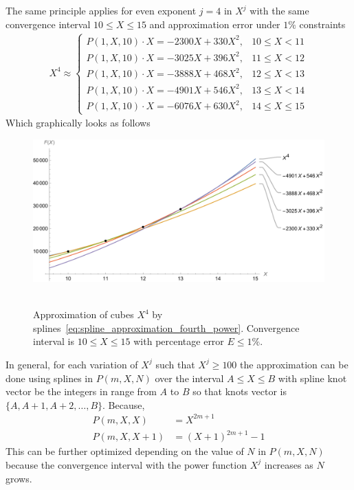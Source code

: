 The same principle applies for even exponent $j=4$ in $X^j$ with the same convergence interval $10 \leq X \leq 15$
and approximation error under $1\%$ constraints
\begin{align}
    X^4 \approx
    \begin{cases}
        P(1,X,10) \cdot X = -2300X + 330X^2, & 10 \leq X < 11 \\
        P(1,X,10) \cdot X = -3025X + 396X^2, & 11 \leq X < 12 \\
        P(1,X,10) \cdot X = -3888X + 468X^2, & 12 \leq X < 13 \\
        P(1,X,10) \cdot X = -4901X + 546X^2, & 13 \leq X < 14 \\
        P(1,X,10) \cdot X = -6076X + 630X^2, & 14 \leq X \leq 15
    \end{cases}
    \label{eq:spline_approximation_fourth_power}
\end{align}
Which graphically looks as follows
\begin{figure}[H]
    \centering
    \includegraphics[width=1\textwidth]{sections/images/09_plots_of_fourth_power_with_p_2_10_15_times_x}
    ~\caption{
        Approximation of cubes $X^4$ by splines~\eqref{eq:spline_approximation_fourth_power}.
        Convergence interval is $10 \leq X \leq 15$ with percentage error $E\leq 1\%$.
    }
    \label{fig:09_plots_of_fourth_power_with_p_2_10_15_times_x}
\end{figure}
In general, for each variation of $X^j$ such that $X^j \geq 100$ the approximation can be done using
splines in $P(m,X, N)$ over the interval $A \leq X \leq B$ with spline knot vector be the integers in
range from $A$ to $B$ so that knots vector is $\{A, A+1, A+2, \ldots, B \}$.
Because,
\begin{align*}
    P(m,X, X) &= X^{2m+1} \\
    P(m,X, X+1) &= (X+1)^{2m+1} - 1
\end{align*}
This can be further optimized depending on the value of $N$ in $P(m,X,N)$ because the convergence interval
with the power function $X^j$ increases as $N$ grows.
